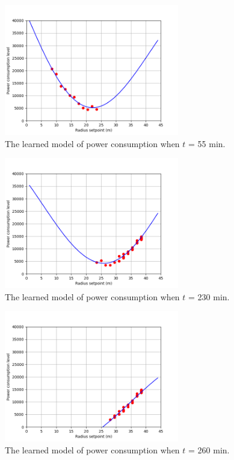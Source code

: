 \begin{sloppypar}
\begin{figure}[!htp]
	\centering
	\includegraphics[width=3in]{Images/reward_010.png}
	\caption{The learned model of power consumption when $t$ = 55 min.}
\end{figure}

\begin{figure}[!htp]
	\centering
	\includegraphics[width=3in]{Images/reward_045.png}
	\caption{The learned model of power consumption when $t$ = 230 min.}
\end{figure}

\begin{figure}[!htp]
	\centering
	\includegraphics[width=3in]{Images/reward_051.png}
	\caption{The learned model of power consumption when $t$ = 260 min.}
\end{figure}


\end{sloppypar}
